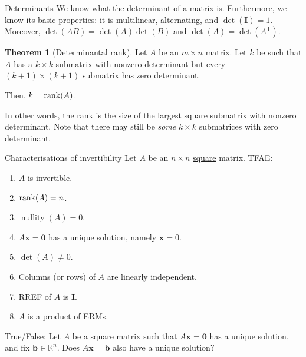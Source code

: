 \documentclass[dvipsnames]{beamer}
\newcommand{\TT}{\mathsf{T}}
\DeclareMathOperator{\nullity}{nullity}
\theoremstyle{definition}
\newtheorem{thm}{Theorem}
\begin{document}
\begin{frame}{Determinants}
    We know what the determinant of a matrix is. Furthermore, we know its basic properties: it is multilinear, alternating, and $\det(\mathbf{I}) = 1$. \pause Moreover, $\det(AB) = \det(A)\det(B)$ and $\det(A) = \det(A^{\TT})$. \pause

    \begin{thm}[Determinantal rank]
        Let $A$ be an $m \times n$ matrix. \pause Let $k$ be such that $A$ has a $k \times k$ submatrix with nonzero determinant \pause but every $(k + 1) \times (k + 1)$ submatrix has zero determinant. \pause

        Then, $k = \operatorname{rank}(A)$.
    \end{thm} \pause

    In other words, the rank is the size of the largest square submatrix with nonzero determinant. \pause Note that there may still be \emph{some} $k \times k$ submatrices with zero determinant.
\end{frame}
\begin{frame}{Characterisations of invertibility}
    Let $A$ be an $n \times n$ \underline{square} matrix. TFAE: \pause
    \begin{enumerate}[<+->]
        \item $A$ is invertible.
        \item $\operatorname{rank}(A) = n$.
        \item $\nullity(A) = 0$.
        \item $A \mathbf{x} = \mathbf{0}$ has a unique solution, namely $\mathbf{x} = 0$.
        \item $\det(A) \neq 0$.
        \item Columns (or rows) of $A$ are linearly independent.
        \item RREF of $A$ is $\mathbf{I}$.
        \item $A$ is a product of ERMs.
    \end{enumerate} \pause

    True/False: Let $A$ be a square matrix such that $A \mathbf{x} = \mathbf{0}$ has a unique solution, and fix $\mathbf{b} \in \mathbb{K}^{n}$. Does $A \mathbf{x} = \mathbf{b}$ also have a unique solution?
\end{frame}
\end{document}
